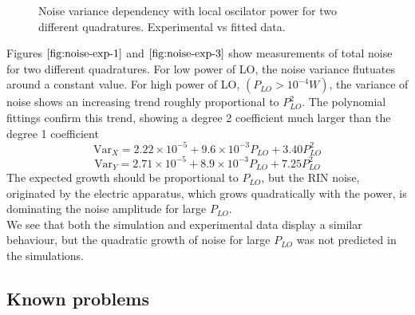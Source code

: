 \begin{bibunit}[plain]
\begin{figure}[H]
	\captionsetup{justification=centering}
	\caption{Noise variance dependency with local oscilator power for two different quadratures. Experimental vs fitted data.}
\end{figure}
%
Figures $\ref{fig:noise-exp-1}$ and $\ref{fig:noise-exp-3}$ show measurements of total noise for two different quadratures. For low power of LO, the noise variance flutuates around a constant value. For high power of LO, $(P_{LO}>10^{-4}W)$, the variance of noise shows an increasing trend roughly proportional to $P_{LO}^2$. The polynomial fittings confirm this trend, showing a degree 2 coefficient much larger than the degree 1 coefficient
%
\begin{equation}
\textrm{Var}_X = 2.22 \!\! \times \!\! 10^{-5} + 9.6 \!\! \times \!\! 10^{-3} P_{LO} + 3.40 P_{LO}^2
\end{equation}
\begin{equation}
\textrm{Var}_Y = 2.71 \!\! \times \!\! 10^{-5} + 8.9 \!\! \times \!\! 10^{-3} P_{LO} + 7.25 P_{LO}^2
\end{equation}
%
The expected growth should be proportional to $P_{LO}$, but the RIN noise, originated by the electric apparatus, which grows quadratically with the power, is dominating the noise amplitude for large $P_{LO}$.\\
We see that both the simulation and experimental data display a similar behaviour, but the quadratic growth of noise for large $P_{LO}$ was not predicted in the simulations.\\
%
%
\subsection{Known problems}
%
%
\end{bibunit}
%
